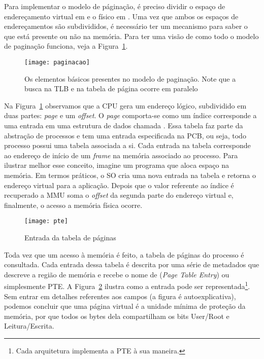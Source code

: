Para implementar o modelo de páginação, é preciso dividir o espaço de
endereçamento virtual em  e o físico em
. Uma vez que ambos os espaços de endereçamentos são
subdivididos, é necessário ter um mecanismo para saber o que está presente ou
não na memória. Para ter uma visão de como todo o modelo de paginação funciona,
veja a Figura~\ref{fig:paginacao}.

\begin{figure}[!h]
  \centering
  \texttt{[image: paginacao]} 
  \caption{Os elementos básicos presentes no modelo de paginação. Note que a busca na TLB e na tabela de página ocorre em paralelo}
  \label{fig:paginacao}
\end{figure}

Na Figura~\ref{fig:paginacao} observamos que a CPU gera um endereço lógico,
subdividido em duas partes: \textit{page} e um \textit{offset}. O \emph{page}
comporta-se como um índice corresponde a uma entrada em uma estrutura de dados
chamada . Essa tabela faz parte da abstração
de processos e tem uma entrada especificada na PCB, ou seja, todo processo
possui uma tabela associada a si. Cada entrada na tabela corresponde ao
endereço de início de um \emph{frame} na memória associado ao processo.  Para
ilustrar melhor esse conceito, imagine um programa que aloca espaço na memória.
Em termos práticos, o SO cria uma nova entrada na tabela e retorna o endereço
virtual para a aplicação.  Depois que o valor referente ao índice é recuperado
a MMU soma o \textit{offset} da segunda parte do endereço virtual e, finalmente,
o acesso a memória física ocorre.

\begin{figure}[!h]
  \centering
  \texttt{[image: pte]}
  \caption{Entrada da tabela de páginas}
  \label{fig:pte}
\end{figure}

Toda vez que um acesso à memória é feito, a tabela de páginas do processo é
consultada. Cada entrada dessa tabela é descrita por uma série de metadados que
descreve a região de memória e recebe o nome de  (\textit{Page Table Entry}) ou simplesmente PTE. A
Figura~\ref{fig:pte} ilustra como a entrada pode ser representada\footnote{Cada
arquitetura implementa a PTE à sua maneira.}. Sem entrar em detalhes referentes
aos campos (a figura é autoexplicativa), podemos concluir que uma página
virtual é a unidade mínima de proteção da memória, por que todos os bytes dela
compartilham os bits User/Root e Leitura/Escrita.

